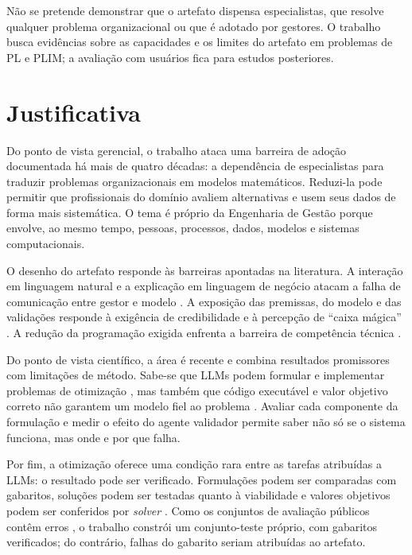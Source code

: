 Não se pretende demonstrar que o artefato dispensa especialistas, que resolve qualquer problema organizacional ou que é adotado por gestores. O trabalho busca evidências sobre as capacidades e os limites do artefato em problemas de PL e PLIM; a avaliação com usuários fica para estudos posteriores.

\section{Justificativa}

Do ponto de vista gerencial, o trabalho ataca uma barreira de adoção documentada há mais de quatro décadas: a dependência de especialistas para traduzir problemas organizacionais em modelos matemáticos. Reduzi-la pode permitir que profissionais do domínio avaliem alternativas e usem seus dados de forma mais sistemática. O tema é próprio da Engenharia de Gestão porque envolve, ao mesmo tempo, pessoas, processos, dados, modelos e sistemas computacionais.

O desenho do artefato responde às barreiras apontadas na literatura. A interação em linguagem natural e a explicação em linguagem de negócio atacam a falha de comunicação entre gestor e modelo \cite{henderson1980}. A exposição das premissas, do modelo e das validações responde à exigência de credibilidade \cite{shobrys2002} e à percepção de ``caixa mágica'' \cite{lawless2025}. A redução da programação exigida enfrenta a barreira de competência técnica \cite{lai2013}.

Do ponto de vista científico, a área é recente e combina resultados promissores com limitações de método. Sabe-se que LLMs podem formular e implementar problemas de otimização \cite{mostajabdaveh2024, ahmaditeshnizi2024}, mas também que código executável e valor objetivo correto não garantem um modelo fiel ao problema \cite{refai2025}. Avaliar cada componente da formulação e medir o efeito do agente validador permite saber não só se o sistema funciona, mas onde e por que falha.

Por fim, a otimização oferece uma condição rara entre as tarefas atribuídas a LLMs: o resultado pode ser verificado. Formulações podem ser comparadas com gabaritos, soluções podem ser testadas quanto à viabilidade e valores objetivos podem ser conferidos por \textit{solver} \cite{ramamonjison2023, refai2025}. Como os conjuntos de avaliação públicos contêm erros \cite{xiao2025}, o trabalho constrói um conjunto-teste próprio, com gabaritos verificados; do contrário, falhas do gabarito seriam atribuídas ao artefato.

